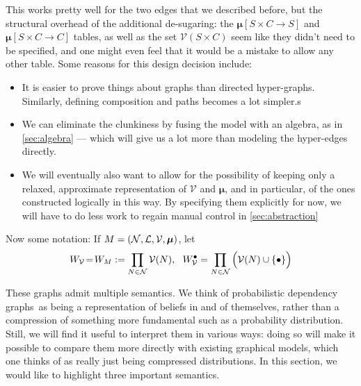 \documentclass{article}
\newcommand\bmu{\boldsymbol{\mu}}
\newcommand{\modelname}{probabilistic dependency graph}
\newcommand{\modelnames}{\modelname s}
\def\seq{\!=\!}
\begin{document}

	

	\begin{vfull}
		This works pretty well for the two edges that we described before, but the structural overhead of the additional de-sugaring: the $\boldsymbol\mu[S\times C\to S]$ and $\boldsymbol\mu[S\times C\to C]$ tables, as well as the set $\mathcal V(S \times C)$ seem like they didn't need to be specified, and one might even feel that it would be a mistake to allow any other table. Some reasons for this design decision include:
		\begin{itemize}[nosep]
			\item It is easier to prove things about graphs than directed hyper-graphs. Similarly, defining composition and paths becomes a lot simpler.s
			\item We can eliminate the clunkiness by fusing the model with an algebra, as in \cref{sec:algebra} --- which will give us a lot more than modeling the hyper-edges directly.
			\item We will eventually also want to allow for the possibility of keeping only a relaxed, approximate representation of $\mathcal V$ and $\bmu$, and in particular, of the ones constructed logically in this way. By specifying them explicitly for now, we will have to do less work to regain manual control in \cref{sec:abstraction}
		\end{itemize}
	\end{vfull}


	Now some notation: If $M = \mnvars[]$, let 
	$$W_{\cal V} \seq W_M :=  \prod_{N \in \mathcal N}\mathcal V(N),~~ W_{\cal V}^\bullet = \prod_{N \in \mathcal N}\Big(\mathcal V(N) \cup \{\bullet\} \Big)$$
			
	These graphs admit multiple semantics. We think of \modelnames\ as being a representation of beliefs in and of themselves, rather than a compression of something more fundamental such as a probability distribution. Still, we will find it useful to interpret them in various ways: doing so will make it possible to compare them more directly with existing graphical models, which one thinks of as really just being compressed distributions. In this section, we would like to highlight three important semantics.
	
\end{document}
